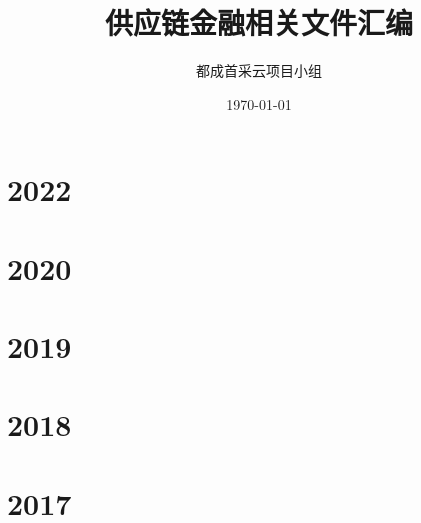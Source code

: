\documentclass[a4paper,12pt,fntef]{ctexrep}
\begin{document}
\title{\Huge \bf 供应链金融相关文件汇编}
\author{\kaishu 都成首采云项目小组}
\date{\small \kaishu \today}

\maketitle

\tableofcontents

\part{2022}



\part{2020}





\part{2019}




\part{2018}


\part{2017}


\end{document}
